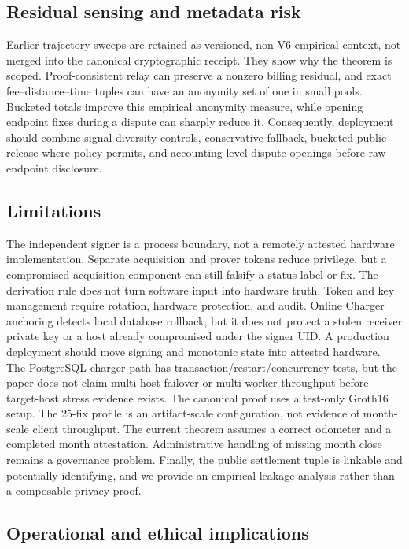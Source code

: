 \documentclass[conference]{IEEEtran}
\theoremstyle{plain}
\theoremstyle{definition}
\begin{document}
\subsection{Residual sensing and metadata risk}

Earlier trajectory sweeps are retained as versioned, non-V6 empirical context,
not merged into the canonical cryptographic receipt. They show why the theorem
is scoped. Proof-consistent relay can preserve a nonzero billing residual, and
exact fee--distance--time tuples can have an anonymity set of one in small pools.
Bucketed totals improve this empirical anonymity measure, while opening endpoint
fixes during a dispute can sharply reduce it. Consequently, deployment should
combine signal-diversity controls, conservative fallback, bucketed public
release where policy permits, and accounting-level dispute openings before raw
endpoint disclosure.

\subsection{Limitations}

The independent signer is a process boundary, not a remotely attested hardware
implementation. Separate acquisition and prover tokens reduce privilege, but a
compromised acquisition component can still falsify a status label or fix. The
derivation rule does not turn software input into hardware truth. Token and key
management require rotation, hardware protection, and audit. Online Charger
anchoring detects local database rollback, but it does not protect a stolen
receiver private key or a host already compromised under the signer UID. A
production deployment should move signing and monotonic state into attested
hardware. The PostgreSQL charger path has transaction/restart/concurrency tests,
but the paper does not claim multi-host failover or multi-worker throughput
before target-host stress evidence exists. The canonical proof uses a test-only
Groth16 setup. The 25-fix profile is an artifact-scale configuration, not
evidence of month-scale client throughput. The current theorem assumes a
correct odometer and a completed month attestation. Administrative handling of
missing month close remains a governance problem. Finally, the public
settlement tuple is linkable and potentially identifying, and we provide an
empirical leakage analysis rather than a composable privacy proof.

\subsection{Operational and ethical implications}
\end{document}
